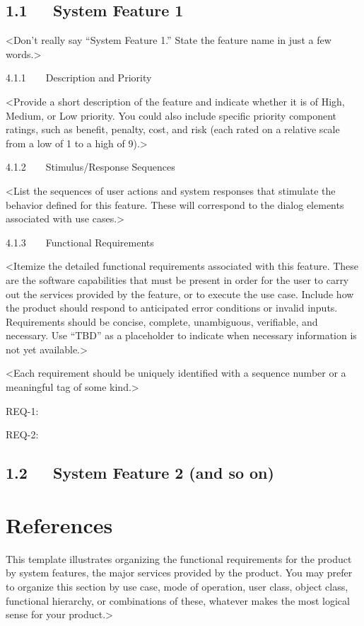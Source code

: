 \documentclass{scrreprt}
\begin{document}
\subsection*{1.1   System Feature 1}

<Don’t really say “System Feature 1.” State the feature name in just a few words.>

4.1.1    Description and Priority

<Provide a short description of the feature and indicate whether it is of High, Medium, or Low priority. You could also include specific priority component ratings, such as benefit, penalty, cost, and risk (each rated on a relative scale from a low of 1 to a high of 9).>

4.1.2    Stimulus/Response Sequences

<List the sequences of user actions and system responses that stimulate the behavior defined for this feature. These will correspond to the dialog elements associated with use cases.>

4.1.3    Functional Requirements

<Itemize the detailed functional requirements associated with this feature. These are the software capabilities that must be present in order for the user to carry out the services provided by the feature, or to execute the use case. Include how the product should respond to anticipated error conditions or invalid inputs. Requirements should be concise, complete, unambiguous, verifiable, and necessary. Use “TBD” as a placeholder to indicate when necessary information is not yet available.>

<Each requirement should be uniquely identified with a sequence number or a meaningful tag of some kind.>

REQ-1:

REQ-2:

\subsection*{1.2   System Feature 2 (and so on)}
    \section{References} 
    This template illustrates organizing the functional requirements for the product by system features, the major services provided by the product. You may prefer to organize this section by use case, mode of operation, user class, object class, functional hierarchy, or combinations of these, whatever makes the most logical sense for your product.>
\end{document}
